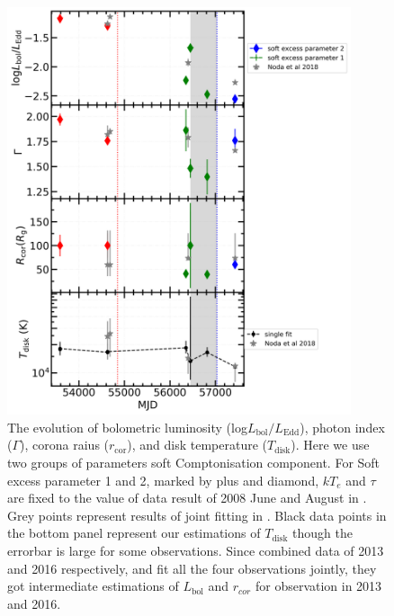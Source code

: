 \documentclass[twocolumn]{aastex63}
\begin{document}
\begin{figure}
\centering
	\includegraphics[width=0.9\textwidth]{./pic/Mrk1018_disk_time_evolution.png}
    \caption{The evolution of bolometric luminosity (log$L_\mathrm{bol}/L_\mathrm{Edd}$), photon index ($\Gamma$), corona raius ($r_\mathrm{cor}$), and disk temperature ($T_\mathrm{disk}$). Here we use two groups of parameters soft Comptonisation component. For Soft excess parameter 1 and 2, marked by plus and diamond, $kT_e$ and $\tau$ are fixed to the value of data result of 2008 June and August in \citep{2018MNRAS.480.3898N}. Grey points represent results of joint fitting in \citep{2018MNRAS.480.3898N}. Black data points in the bottom panel represent our estimations of $T_\mathrm{disk}$ though the errorbar is large for some observations. Since \citep{2018MNRAS.480.3898N} combined data of 2013 and 2016 respectively, and fit all the four observations jointly, they got intermediate estimations of $L_\mathrm{bol}$ and $r_{cor}$ for observation in 2013 and 2016.}
    \label{fig:disk_evoliton}
\end{figure}
\end{document}
